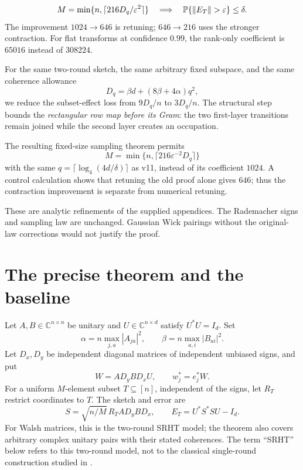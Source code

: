 \documentclass[11pt]{article}
\numberwithin{equation}{section}
\theoremstyle{definition}\newtheorem{definition}[theorem]{Definition}
\theoremstyle{remark}\newtheorem{remark}[theorem]{Remark}
\newcommand{\C}{\mathbb C}
\begin{document}
\vspace{2mm}
\begin{takeaway}[title={Quantitative endpoint},top=4pt,bottom=4pt]
\small
\setlength{\abovedisplayskip}{4pt}\setlength{\belowdisplayskip}{4pt}
\[
 M=\min\{n,\lceil216D_q/\varepsilon^2\rceil\}
 \quad\Longrightarrow\quad \Prob\{\|E_T\|>\varepsilon\}\le\delta.
\]
The improvement $1024\to646$ is retuning; $646\to216$ uses the stronger
contraction. For flat transforms at confidence $0.99$, the rank-only
coefficient is $65016$ instead of $308224$.
\end{takeaway}
\clearpage
\begin{takeaway}[title=Universal improvement]
For the same two-round sketch, the same arbitrary fixed subspace, and the same coherence allowance
\[
 D_q=\beta d+(8\beta+4\alpha)q^2,
\]
we reduce the subset-effect loss from $9D_q/n$ to $3D_q/n$. The structural step bounds the \emph{rectangular row map before its Gram}: the two first-layer transitions remain joined while the second layer creates an occupation.

The resulting fixed-size sampling theorem permits
\[
 \boxed{M=\min\{n,\lceil216\varepsilon^{-2}D_q\rceil\}}
\]
with the same $q=\lceil\log_4(4d/\delta)\rceil$ as v11, instead of its coefficient $1024$. A control calculation shows that retuning the old proof alone gives $646$; thus the contraction improvement is separate from numerical retuning.

These are analytic refinements of the supplied appendices. The Rademacher signs and sampling law are unchanged. Gaussian Wick pairings without the original-law corrections would not justify the proof.
\end{takeaway}

\section{The precise theorem and the baseline}
\label{sec:model}
Let $A,B\in\C^{n\times n}$ be unitary and $U\in\C^{n\times d}$ satisfy $U^*U=I_d$. Set
\begin{equation}
 \alpha=n\max_{j,a}|A_{ja}|^2,\qquad
 \beta=n\max_{a,i}|B_{ai}|^2.
 \label{eq:coherence}
\end{equation}
Let $D_x,D_y$ be independent diagonal matrices of independent unbiased signs, and put
\[
 W=AD_yBD_xU,\qquad w_j^*=e_j^*W.
\]
For a uniform $M$-element subset $T\subseteq[n]$, independent of the signs, let $R_T$ restrict coordinates to $T$. The sketch and error are
\begin{equation}
 S=\sqrt{n/M}\,R_TAD_yBD_x,\qquad E_T=U^*S^*SU-I_d.
 \label{eq:sketch}
\end{equation}
For Walsh matrices, this is the two-round SRHT model; the theorem also covers arbitrary complex unitary pairs with their stated coherences. The term ``SRHT'' below refers to this two-round model, not to the classical single-round construction studied in \cite{TroppSRHT}.
\end{document}
